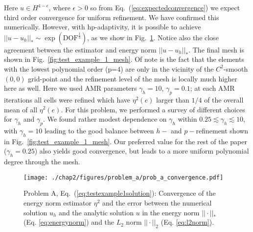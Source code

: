 Here $u \in H^{4-\epsilon}$, where $\epsilon > 0$ so from
Eq.~(\ref{eq:expectedconvergence}) we expect third order convergence
for uniform refinement. We have confirmed this numerically. However,
with hp-adaptivity, it is possible to achieve $||u-u_{h}||_{*} \sim
\exp(\text{DOF}^{\frac{1}{3}})$, as we show in
Fig.~\ref{fig:test_example_1_u_convergence}. Notice also the close
agreement between the estimator and energy norm $||u-u_{h}||_*$. The final mesh is shown in Fig.~\ref{fig:test_example_1_mesh}. Of
note is the fact that the elements with the lowest polynomial order
(p=4) are only in the vicinity of the $C^{2}$-smooth $(0,0)$
grid-point and the refinement level of the mesh is locally much higher
here as well. Here we
used AMR parameters $\gamma_h = 10$, $\gamma_p = 0.1$; at each AMR
iterations all cells were refined which have $\eta^2(e)$ larger than
$1/4$ of the overall mean of all $\eta^2(e)$. For this
problem, we performed a survey of different choices for $\gamma_h$
and $\gamma_p$.  We found rather modest dependence on $\gamma_h$
within $0.25\lesssim \gamma_h\lesssim 10$, with $\gamma_h\!=\!10$ leading to the good balance between
$h-$ and $p-$refinement shown in Fig.~\ref{fig:test_example_1_mesh}.
Our preferred value for the rest of the paper ($\gamma_h=0.25$) also
yields good convergence, but leads to a more uniform polynomial
degree through the mesh.


\begin{figure}[ht!]
  \centering
  \texttt{[image: ./chap2/figures/problem\_a/prob\_a\_convergence.pdf]}
  \caption{Problem A, Eq.~(\ref{eq:testexample1solution}): Convergence of the energy norm estimator $\eta^2$ and the error between the numerical solution $u_h$ and the analytic solution $u$ in the energy norm $||\cdot||_*$ (Eq. \ref{eq:energynorm}) and the $L_2$ norm $||\cdot||_2$ (Eq. \ref{eq:l2norm}).}
  \label{fig:test_example_1_u_convergence} 
\end{figure}

